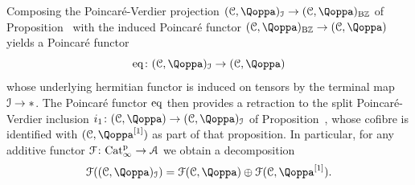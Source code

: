 \begin{remark}
\label{remark:equ}%
Composing the Poincaré-Verdier projection $(\C,\QF)_\I \to (\C,\QF)_{\B\ZZ}$ of Proposition~ with the induced Poincaré functor $(\C,\QF)_{\B\ZZ} \to (\C,\QF)$ yields a Poincaré functor
\[
\equ\colon (\C,\QF)_\I \to (\C,\QF)
\]
whose underlying hermitian functor is induced on tensors by the terminal map $\mathcal{I} \to \ast$. The Poincaré functor $\mathrm{eq}$ then provides a retraction to the split Poincaré-Verdier inclusion $i_1\colon (\C,\QF) \to (\C,\QF)_\I$ of Proposition~, whose cofibre is identified with $(\C,\QF\qshift{1})$ as part of that proposition. In particular, 
for any additive functor $\mathcal{F}\colon \mathrm{Cat}^{\mathrm p}_\infty \to \mathcal{A}$ we obtain a decomposition 
\[
\F((\C,\QF)_\I) = \F(\C,\QF) \oplus \F(\C,\QF\qshift{1}) .
\]
\end{remark}

